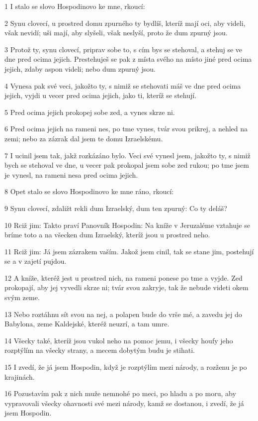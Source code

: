 \par 1 I stalo se slovo Hospodinovo ke mne, rkoucí:
\par 2 Synu clovecí, u prostred domu zpurného ty bydlíš, kteríž mají oci, aby videli, však nevidí; uši mají, aby slyšeli, však neslyší, proto že dum zpurný jsou.
\par 3 Protož ty, synu clovecí, priprav sobe to, s cím bys se stehoval, a stehuj se ve dne pred ocima jejich. Prestehuješ se pak z místa svého na místo jiné pred ocima jejich, zdaby aspon videli; nebo dum zpurný jsou.
\par 4 Vynesa pak své veci, jakožto ty, s nimiž se stehovati máš ve dne pred ocima jejich, vyjdi u vecer pred ocima jejich, jako ti, kteríž se stehují.
\par 5 Pred ocima jejich prokopej sobe zed, a vynes skrze ni.
\par 6 Pred ocima jejich na rameni nes, po tme vynes, tvár svou prikrej, a nehled na zemi; nebo za zázrak dal jsem te domu Izraelskému.
\par 7 I ucinil jsem tak, jakž rozkázáno bylo. Veci své vynesl jsem, jakožto ty, s nimiž bych se stehoval ve dne, u vecer pak prokopal jsem sobe zed rukou; po tme jsem je vynesl, na rameni nesa pred ocima jejich.
\par 8 Opet stalo se slovo Hospodinovo ke mne ráno, rkoucí:
\par 9 Synu clovecí, zdaližt rekli dum Izraelský, dum ten zpurný: Co ty deláš?
\par 10 Rciž jim: Takto praví Panovník Hospodin: Na kníže v Jeruzaléme vztahuje se bríme toto a na všecken dum Izraelský, kteríž jsou u prostred neho.
\par 11 Rciž jim: Já jsem zázrakem vaším. Jakož jsem cinil, tak se stane jim, postehují se a v zajetí pujdou.
\par 12 A kníže, kteréž jest u prostred nich, na rameni ponese po tme a vyjde. Zed prokopají, aby jej vyvedli skrze ni; tvár svou zakryje, tak že nebude videti okem svým zeme.
\par 13 Nebo roztáhnu sít svou na nej, a polapen bude do vrše mé, a zavedu jej do Babylona, zeme Kaldejské, kteréž neuzrí, a tam umre.
\par 14 Všecky také, kteríž jsou vukol neho na pomoc jemu, i všecky houfy jeho rozptýlím na všecky strany, a mecem dobytým budu je stihati.
\par 15 I zvedí, že já jsem Hospodin, když je rozptýlím mezi národy, a rozženu je po krajinách.
\par 16 Pozustavím pak z nich muže nemnohé po meci, po hladu a po moru, aby vypravovali všecky ohavnosti své mezi národy, kamž se dostanou, i zvedí, že já jsem Hospodin.
